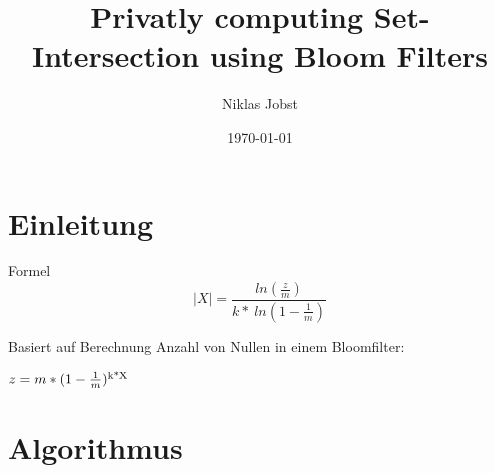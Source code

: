 \documentclass{beamer}
\title[Privatly computing Set-Intersection]{Privatly computing Set-Intersection using Bloom Filters}
\author{Niklas Jobst}
\institute{TCS - Universität zu Lübeck}
\date{\today}
\begin{document}
\section{Einleitung}
\begin{frame}{Formel}
	$$ |X| = \frac{ln( \frac{z}{m})}{k* \ ln(1- \frac{1}{m})}$$
	
	\begin{arrowlist}
		\item Basiert auf Berechnung Anzahl von Nullen in einem Bloomfilter:
		\item 	$ z = m*(1 -\frac{1}{m})\textsuperscript{k*X}$ 
	\end{arrowlist}

\end{frame}

\section{Algorithmus}
\end{document}
